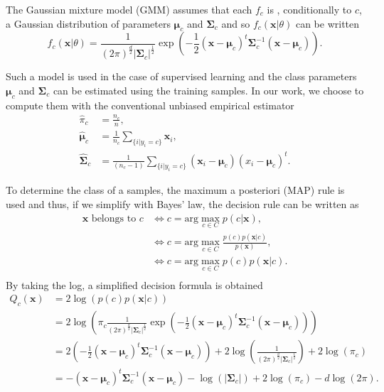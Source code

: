 \documentclass[a4paper,11pt,DIV=16,abstracton]{scrartcl}
\begin{document}
    The Gaussian mixture model (GMM) assumes that each $f_c$ is , conditionally to $c$, a Gaussian distribution of parameters $\boldsymbol{\mu}_c$ and $\boldsymbol{\Sigma}_c$ and so $f_c(\mathbf{x}|\theta)$ can be written
    \begin{equation*}
        f_c(\mathbf{x}|\theta) = \frac{1}{(2\pi)^{\frac{d}{2}} |\boldsymbol{\Sigma}_c|^{\frac{1}{2}}} \exp \left( -\frac{1}{2} (\mathbf{x} - \boldsymbol{\mu}_c)^t \boldsymbol{\Sigma}_c^{-1} (\mathbf{x} - \boldsymbol{\mu}_c) \right).
    \end{equation*}

    Such a model is used in the case of supervised learning and the class parameters $\boldsymbol{\mu}_c$ and $\boldsymbol{\Sigma}_c$ can be estimated using the training samples. In our work, we choose to compute them with the conventional unbiased empirical estimator
    \begin{align}
        \hat{\pi}_c &= \frac{n_c}{n},\\
        \hat{\boldsymbol{\mu}}_c &= \frac{1}{n_c} \sum_{\{i|y_i = c\}} \mathbf{x}_i ,\\
        \hat{\boldsymbol{\Sigma}}_c &= \frac{1}{(n_c - 1)} \sum_{\{i|y_i = c\}} (\mathbf{x}_i - \boldsymbol{\mu}_c) (\boldsymbol{}x_i - \boldsymbol{\mu}_c)^t.
    \end{align}

    To determine the class of a samples, the maximum a posteriori (MAP) rule is used and thus, if we simplify with Bayes' law, the decision rule can be written as
    \begin{align*}
        \mathbf{x} \text{ belongs to } c &\Leftrightarrow c = \text{arg} \max_{c \in C} p(c|\mathbf{x}),\\
                                         &\Leftrightarrow c = \text{arg} \max_{c \in C} \frac{p(c) p(\mathbf{x}|c)}{p(\mathbf{x})},\\
                                         &\Leftrightarrow c = \text{arg} \max_{c \in C} p(c) p(\mathbf{x}|c).\\
    \end{align*}
    By taking the log, a simplified decision formula is obtained
    \begin{align}
        Q_c(\mathbf{x})
        &= 2 \log \left( p(c) p(\mathbf{x}|c) \right) \nonumber \\
        &= 2 \log \left( \pi_c \frac{1}{(2\pi)^{\frac{d}{2}} |\boldsymbol{\Sigma}_c|^{\frac{1}{2}}} \exp \left( -\frac{1}{2} (\mathbf{x} - \boldsymbol{\mu}_c)^t \boldsymbol{\Sigma}_c^{-1} (\mathbf{x} - \boldsymbol{\mu}_c) \right) \right) \nonumber \\
        &= 2 \left( -\frac{1}{2} (\mathbf{x} - \boldsymbol{\mu}_c)^t \boldsymbol{\Sigma}_c^{-1} (\mathbf{x} - \boldsymbol{\mu}_c) \right) + 2 \log \left( \frac{1}{(2\pi)^{\frac{d}{2}} |\boldsymbol{\Sigma}_c|^{\frac{1}{2}}} \right) + 2 \log (\pi_c) \nonumber \\
        &= - (\mathbf{x} - \boldsymbol{\mu}_c)^t \boldsymbol{\Sigma}_c^{-1} (\mathbf{x} - \boldsymbol{\mu}_c) - \log (|\boldsymbol{\Sigma}_c|) + 2 \log (\pi_c) - d \log (2\pi).
        \label{eq:decision}
    \end{align}
\end{document}
